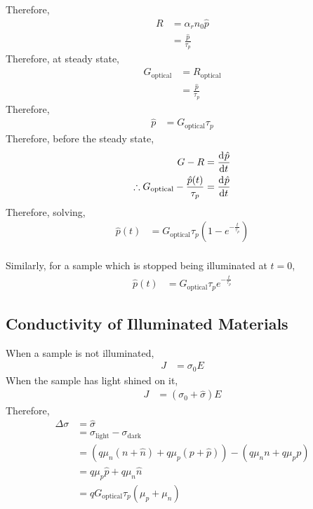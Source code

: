 \documentclass[titlepage, fleqn, a4paper, 12pt, twoside]{article}
\theoremstyle{definition}
\theoremstyle{theorem}
\begin{document}
Therefore,
\begin{align*}
	R &= \alpha_r n_0 \hat{p}\\
	&= \frac{\hat{p}}{\tau_p}
\end{align*}
Therefore, at steady state,
\begin{align*}
	G_{\text{optical}} &= R_{\text{optical}}\\
	&= \frac{\hat{p}}{\tau_p}
\end{align*}
Therefore,
\begin{align*}
	\hat{p} &= G_{\text{optical}} \tau_p
\end{align*}
Therefore, before the steady state,
\begin{align*}
	G - R &= \dod{\hat{p}}{t}\\
	\therefore G_{\text{optical}} - \frac{\hat{p}(t)}{\tau_p} &= \dod{\hat{p}}{t}
\end{align*}
Therefore, solving,
\begin{align*}
	\hat{p}(t) &= G_{\text{optical}} \tau_p \left( 1 - e^{-\frac{t}{\tau_p}} \right)
\end{align*}
~\\
Similarly, for a sample which is stopped being illuminated at $t = 0$,
\begin{align*}
	\hat{p}(t) &= G_{\text{optical}} \tau_p e^{-\frac{t}{\tau_p}}
\end{align*}

\subsection{Conductivity of Illuminated Materials}

When a sample is not illuminated,
\begin{align*}
	J &= \sigma_0 E
\end{align*}
When the sample has light shined on it,
\begin{align*}
	J &= \left( \sigma_0 + \hat{\sigma} \right) E
\end{align*}
Therefore,
\begin{align*}
	\Delta \sigma &= \hat{\sigma}\\
	&= \sigma_{\text{light}} - \sigma_{\text{dark}}\\
	&= \left( q \mu_n \left( n + \hat{n} \right) + q \mu_p \left( p + \hat{p} \right) \right) - \left( q \mu_n n + q \mu_p p  \right)\\
	&= q \mu_p \hat{p} + q \mu_n \hat{n}\\
	&= q G_{\text{optical}} \tau_p (\mu_p + \mu_n)
\end{align*}
\end{document}
